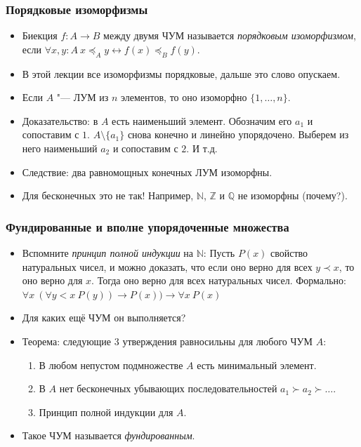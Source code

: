 \documentclass[10pt]{beamer}
\begin{document}
\begin{frame}
    \frametitle{Порядковые изоморфизмы}
\begin{itemize}
    \item Биекция \(f: A \to B\) между двумя ЧУМ называется \emph{порядковым изоморфизмом}, если \( \forall x,y:A ~ x \preccurlyeq_A y \leftrightarrow f(x) \preccurlyeq_B f(y) \).
    \item В этой лекции все изоморфизмы порядковые, дальше это слово опускаем.
    \pause
    \item Если $A$ "--- ЛУМ из $n$ элементов, то оно изоморфно \(\{1,\ldots,n\}\).
    \pause
    \item Доказательство: в $A$ есть наименьший элемент. Обозначим его $a_1$ и сопоставим с $1$. $A \setminus \{a_1\}$ снова конечно и линейно упорядочено. \pause Выберем из него наименьший $a_2$ и сопоставим с $2$. И т.д.
    \pause
    \item Следствие: два равномощных конечных ЛУМ изоморфны.
    \item Для бесконечных это не так! Например, \pause \(\mathbb{N}\), \(\mathbb{Z}\) и \(\mathbb{Q}\) не изоморфны (почему?).
\end{itemize}
\end{frame}

\begin{frame}
    \frametitle{Фундированные и вполне упорядоченные множества}
    \begin{itemize}
        \item Вспомните \emph{принцип полной индукции} на \(\mathbb{N}\): \pause Пусть \(P(x)\) свойство натуральных чисел, и можно доказать, что если оно верно для всех \(y \prec x\), то оно верно для \(x\). Тогда оно верно для всех натуральных чисел. Формально: \( \forall x ~ (\forall y < x ~ P(y)) \to P(x)) \to \forall x ~ P(x) \)
        \pause
        \item Для каких ещё ЧУМ он выполняется?
        \item Теорема: следующие 3 утверждения равносильны для любого ЧУМ $A$:
        \begin{enumerate}
            \item В любом непустом подмножестве $A$ есть минимальный элемент.
            \item В $A$ нет бесконечных убывающих последовательностей $a_1 \succ a_2 \succ \ldots$.
            \item Принцип полной индукции для $A$.
        \end{enumerate}
        \item Такое ЧУМ называется \emph{фундированным}.
    \end{itemize}
\end{frame}
\end{document}
